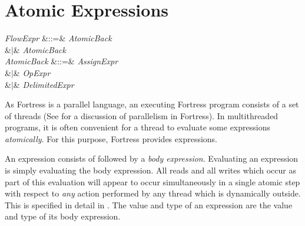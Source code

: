%
%
%
%

\section{Atomic Expressions}


\begin{Grammar}
\emph{FlowExpr} &::=&   \emph{AtomicBack}\\
&$|$&  \emph{AtomicBack} \\

\emph{AtomicBack}
&::=& \emph{AssignExpr}\\
&$|$& \emph{OpExpr}\\
&$|$& \emph{DelimitedExpr}\\

\end{Grammar}

As Fortress is a parallel language, an executing Fortress program consists
of a set of threads (See  for a discussion of
parallelism in Fortress).  In multithreaded programs,
it is often convenient for a thread to evaluate some expressions
\emph{atomically}.  For this purpose, Fortress provides 
expressions.


An  expression consists of 
followed by a \emph{body expression}.  Evaluating an 
expression is simply evaluating the body expression.  All reads and
all writes which occur as part of this evaluation will appear to occur
simultaneously in a single atomic step with respect to \emph{any}
action performed by any thread which is dynamically outside.  This is
specified in detail in .  The value and type of an
 expression are the value and type of its body expression.

